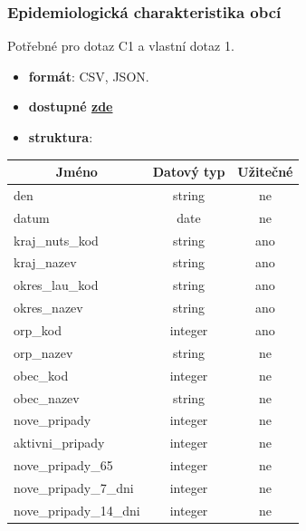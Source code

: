 \documentclass[12pt]{article}
\begin{document}
\subsubsection*{Epidemiologická charakteristika obcí}
Potřebné pro dotaz C1 a vlastní dotaz 1.
\begin{itemize}
    \item \textbf{formát}: CSV, JSON.
    \item \textbf{dostupné  \href{https://onemocneni-aktualne.mzcr.cz/api/v2/covid-19/obce.csv}{zde}}
    \item \textbf{struktura}:
\end{itemize}
        \begin{center}
            \begin{tabular}{ |l|c|c| }
                \hline
                \multicolumn{1}{|c|}{Jméno} & Datový typ & Užitečné \\
                \hline
                \hline
                den & string & ne \\
                \hline
                datum & date & ne \\
                \hline
                kraj\_nuts\_kod & string & ano \\
                \hline
                kraj\_nazev & string & ano \\
                \hline
                okres\_lau\_kod & string & ano \\
                \hline
                okres\_nazev & string & ano \\
                \hline
                orp\_kod & integer & ano \\
                \hline
                orp\_nazev & string & ne \\
                \hline
                obec\_kod & integer & ne \\
                \hline
                obec\_nazev & string & ne \\
                \hline
                nove\_pripady & integer & ne \\
                \hline
                aktivni\_pripady & integer & ne \\
                \hline
                nove\_pripady\_65 & integer & ne \\
                \hline
                nove\_pripady\_7\_dni & integer & ne \\
                \hline
                nove\_pripady\_14\_dni & integer & ne \\
                \hline
            \end{tabular}
        \end{center}
\end{document}
